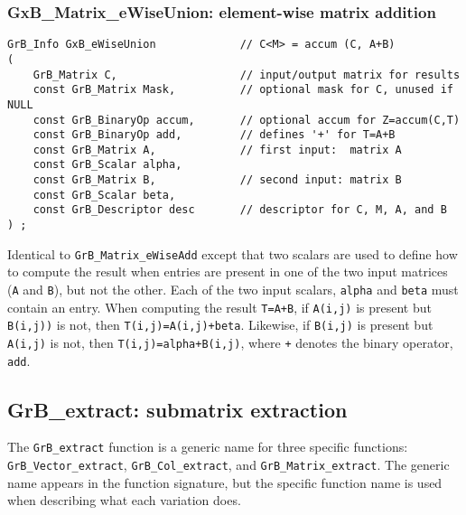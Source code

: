 \documentclass[12pt]{article}
\begin{document}
\newpage
\subsubsection{{\sf GxB\_Matrix\_eWiseUnion:} element-wise matrix addition}
\label{eWiseUnion_matrix}

\begin{mdframed}[userdefinedwidth=6in]
{\footnotesize
\begin{verbatim}
GrB_Info GxB_eWiseUnion             // C<M> = accum (C, A+B)
(
    GrB_Matrix C,                   // input/output matrix for results
    const GrB_Matrix Mask,          // optional mask for C, unused if NULL
    const GrB_BinaryOp accum,       // optional accum for Z=accum(C,T)
    const GrB_BinaryOp add,         // defines '+' for T=A+B
    const GrB_Matrix A,             // first input:  matrix A
    const GrB_Scalar alpha,
    const GrB_Matrix B,             // second input: matrix B
    const GrB_Scalar beta,
    const GrB_Descriptor desc       // descriptor for C, M, A, and B
) ;
\end{verbatim} } \end{mdframed}

Identical to \verb'GrB_Matrix_eWiseAdd' except that two scalars are used
to define how to compute the result when entries are present in one of
the two input matrices (\verb'A' and \verb'B'), but not the other.
Each of the two input scalars, \verb'alpha' and \verb'beta'
must contain an entry.
When computing the result \verb'T=A+B',
if \verb'A(i,j)' is present but \verb'B(i,j))' is not, then \verb'T(i,j)=A(i,j)+beta'.
Likewise,
if \verb'B(i,j)' is present but \verb'A(i,j)' is not, then \verb'T(i,j)=alpha+B(i,j)',
where \verb'+' denotes the binary operator, \verb'add'.

\newpage
\subsection{{\sf GrB\_extract:} submatrix extraction } %
\label{extract}

The \verb'GrB_extract' function is a generic name for three specific functions:
\verb'GrB_Vector_extract', \verb'GrB_Col_extract', and
\verb'GrB_Matrix_extract'.  The generic name appears in the function signature,
but the specific function name is used when describing what each variation
does.
\end{document}
